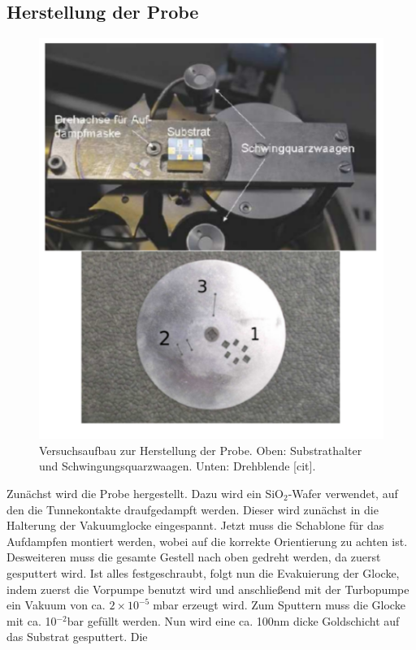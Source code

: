 \documentclass[twoside,        %
               BCOR12mm,       %
               english,ngerman, %
               fleqn,headsepline=false,footsepline=false
              ]{Vorlage/MFPREPORT}
\begin{document}
\subsection{Herstellung der Probe}
\begin{figure}[]
    \centering
    \includegraphics[scale=0.5]{fig/aufbau.png}
    \caption{Versuchsaufbau zur Herstellung der Probe. Oben: Substrathalter und
        Schwingungsquarzwaagen.
    Unten: Drehblende [cit].}
    \label{fig:aufbau}
\end{figure}
Zunächst wird die Probe hergestellt. Dazu wird ein SiO$_2$-Wafer verwendet,
auf den die Tunnekontakte draufgedampft werden. Dieser wird zunächst in die
Halterung der Vakuumglocke eingespannt. Jetzt muss die Schablone für das
Aufdampfen montiert werden, wobei auf die korrekte Orientierung zu achten ist.
Desweiteren muss die gesamte Gestell nach oben gedreht werden, da zuerst
gesputtert wird.
Ist alles festgeschraubt, folgt nun die Evakuierung der Glocke, indem zuerst
die Vorpumpe benutzt wird und anschließend mit der
Turbopumpe ein Vakuum von ca. $2\times10^{-5}\;$mbar erzeugt wird.
Zum Sputtern muss die Glocke mit ca. 10$^{-2}$\;bar gefüllt werden.
Nun wird eine ca. 100\;nm dicke Goldschicht auf das Substrat gesputtert. Die
\end{document}
